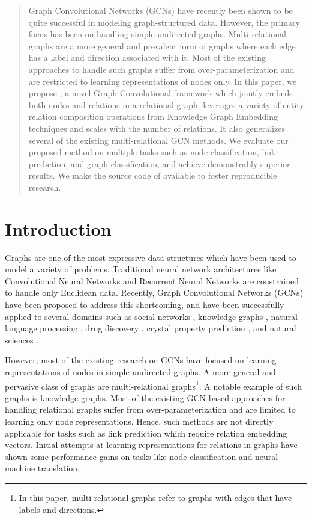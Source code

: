 \documentclass{article} \usepackage{iclr2020_conference,times}
\begin{document}
\begin{abstract}
Graph Convolutional Networks (GCNs) have recently been shown to be quite successful in modeling graph-structured data. However, the primary focus has been on handling simple undirected graphs. Multi-relational graphs are a more general and prevalent form of graphs where each edge has a label and direction associated with it. Most of the existing approaches to handle such graphs suffer from over-parameterization and are restricted to learning representations of nodes only. In this paper, we propose \method{}, a novel Graph Convolutional framework which jointly embeds both nodes and relations in a relational graph. \method{} leverages a variety of entity-relation composition operations from Knowledge Graph Embedding techniques and scales with the number of relations. It also generalizes several of the existing multi-relational GCN methods. We evaluate our proposed method on multiple tasks such as node classification, link prediction, and graph classification, and achieve demonstrably superior results. We make the source code of \method{} available to foster reproducible research.
\end{abstract}



\section{Introduction}
\label{sec:introduction}

Graphs are one of the most expressive data-structures which have been used to model a variety of problems. Traditional neural network architectures like Convolutional Neural Networks \citep{alexnet} and Recurrent Neural Networks \citep{lstm} are constrained to handle only Euclidean data. Recently, Graph Convolutional Networks (GCNs) \citep{Bruna2013,Defferrard2016} have been proposed to address this shortcoming, and have been successfully applied to several domains such as social networks \citep{graphsage}, knowledge graphs \citep{r_gcn}, natural language processing \citep{gcn_srl}, drug discovery \citep{deep_chem}, crystal property prediction \citep{mtcgcnn}, and natural sciences \citep{protein_protein_gcn}.

However, most of the existing research on GCNs \citep{Kipf2016,graphsage,gat} have focused on learning representations of nodes in simple undirected graphs. A more general and pervasive class of graphs are multi-relational graphs\footnote{In this paper, multi-relational graphs refer to graphs with edges that have labels and directions.}. A notable example of such graphs is knowledge graphs. Most of the existing GCN based approaches for handling relational graphs \citep{gcn_srl,r_gcn} suffer from over-parameterization and are limited to learning only node representations.
Hence, such methods are not directly applicable for tasks such as link prediction which require relation embedding vectors.
Initial attempts at learning representations for relations in graphs \citep{dual_primal_gcn,graph2seq} have shown some performance gains on tasks like node classification and neural machine translation.
\end{document}
